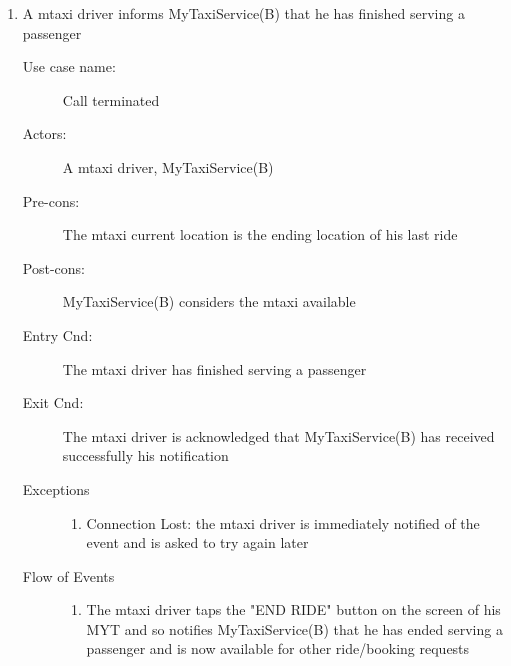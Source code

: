 \documentclass[11pt]{article} %
\begin{document}
\begin{enumerate}
	
	       \item A mtaxi driver informs MyTaxiService(B) that he has finished serving a passenger
		\begin{description}
		        \item [Use case name:] Call terminated
		        \item [Actors:] A mtaxi driver, MyTaxiService(B)
		        \item [Pre-cons:] The mtaxi current location is the ending location of his last ride
		        \item [Post-cons:] MyTaxiService(B) considers the mtaxi available
		        \item [Entry Cnd:] The mtaxi driver has finished serving a passenger
		        \item [Exit Cnd:] The mtaxi driver is acknowledged that MyTaxiService(B) has received successfully his
		        notification
		        \item [Exceptions]\hfill
			\begin{enumerate}
			          \item Connection Lost: the mtaxi driver is immediately notified of the event and is asked to try again
			          later
			\end{enumerate}
		        \item [Flow of Events]\hfill
			\begin{enumerate}
			          \item The mtaxi driver taps the "END RIDE" button on the screen of his MYT and so notifies MyTaxiService(B) that
			          he has ended serving a passenger and is now available for other ride/booking requests
			\end{enumerate}
		\end{description}
	

\end{enumerate}
\end{document}
